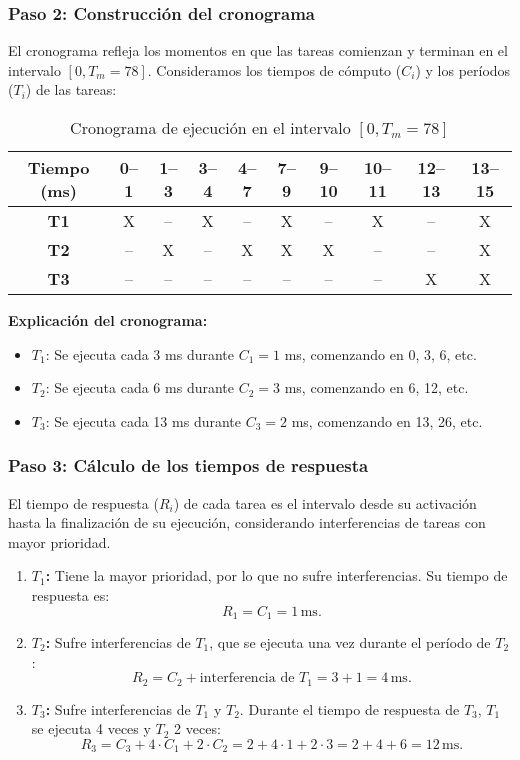 \documentclass[a4paper,12pt]{article}
\begin{document}
\subsubsection{Paso 2: Construcción del cronograma}
El cronograma refleja los momentos en que las tareas comienzan y terminan en el intervalo \([0, T_m = 78]\). Consideramos los tiempos de cómputo (\(C_i\)) y los períodos (\(T_i\)) de las tareas:

\begin{table}[H]
\centering
\begin{tabular}{|c|c|c|c|c|c|c|c|c|c|}
\hline
\textbf{Tiempo (ms)} & 0--1 & 1--3 & 3--4 & 4--7 & 7--9 & 9--10 & 10--11 & 12--13 & 13--15 \\ \hline
\textbf{T1} & X & -- & X & -- & X & -- & X & -- & X \\ \hline
\textbf{T2} & -- & X & -- & X & X & X & -- & -- & X \\ \hline
\textbf{T3} & -- & -- & -- & -- & -- & -- & -- & X & X \\ \hline
\end{tabular}
\caption{Cronograma de ejecución en el intervalo \([0, T_m = 78]\)}
\end{table}

\textbf{Explicación del cronograma:}
\begin{itemize}
    \item \(T_1\): Se ejecuta cada 3 ms durante \(C_1 = 1\) ms, comenzando en 0, 3, 6, etc.
    \item \(T_2\): Se ejecuta cada 6 ms durante \(C_2 = 3\) ms, comenzando en 6, 12, etc.
    \item \(T_3\): Se ejecuta cada 13 ms durante \(C_3 = 2\) ms, comenzando en 13, 26, etc.
\end{itemize}

\subsubsection{Paso 3: Cálculo de los tiempos de respuesta}
El tiempo de respuesta (\(R_i\)) de cada tarea es el intervalo desde su activación hasta la finalización de su ejecución, considerando interferencias de tareas con mayor prioridad.

\begin{enumerate}
    \item \textbf{\(T_1\):} Tiene la mayor prioridad, por lo que no sufre interferencias. Su tiempo de respuesta es:
    \[
    R_1 = C_1 = 1 \, \text{ms}.
    \]

    \item \textbf{\(T_2\):} Sufre interferencias de \(T_1\), que se ejecuta una vez durante el período de \(T_2\):
    \[
    R_2 = C_2 + \text{interferencia de } T_1 = 3 + 1 = 4 \, \text{ms}.
    \]

    \item \textbf{\(T_3\):} Sufre interferencias de \(T_1\) y \(T_2\). Durante el tiempo de respuesta de \(T_3\), \(T_1\) se ejecuta 4 veces y \(T_2\) 2 veces:
    \[
    R_3 = C_3 + 4 \cdot C_1 + 2 \cdot C_2 = 2 + 4 \cdot 1 + 2 \cdot 3 = 2 + 4 + 6 = 12 \, \text{ms}.
    \]
\end{enumerate}
\end{document}

